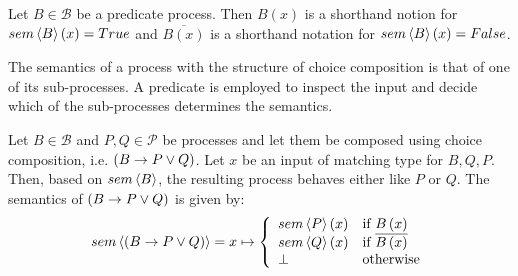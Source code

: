 \begin{definition}
Let $B \in \mathcal{B}$ be a predicate process. Then $B \left( x \right)$ is a shorthand notion for $sem \left\langle B \right\rangle \left( x \right) = True$ and $\overline{B \left( x \right)}$ is a shorthand notation for $sem \left\langle B \right\rangle \left( x \right) = False$.

\hfill\qedsymbol
\end{definition}




The semantics of a process with the structure of choice composition is that of one of its sub-processes. A predicate is employed to inspect the input and decide which of the sub-processes determines the semantics.
\begin{definition}
\label{def:sem_choice}
Let $B \in \mathcal{B}$ and $P, Q \in \mathcal{P}$ be processes and let them be composed using choice composition, i.e. $\left( B \to P \vee Q \right)$. Let $x$ be an input of matching type for $B, Q, P$. Then, based on $sem \left\langle B \right\rangle$, the resulting process behaves either like $P$ or $Q$. The semantics of $\left( B \to P \vee Q \right)$ is given by:
  \begin{equation*}
    \label{eqn:sem_choice}
    sem \left\langle \left( B \to P \vee Q \right) \right\rangle = x \mapsto \left\{ \begin{array}{ll}
      sem \left\langle P \right\rangle\left(x\right) & \text{if } B \left( x \right) \\
      sem \left\langle Q \right\rangle\left(x\right) & \text{if } \overline{B \left( x \right)} \\
      \bot & \text{otherwise}
    \end{array}\right.
  \end{equation*}
  
  \hfill\qedsymbol
\end{definition}

